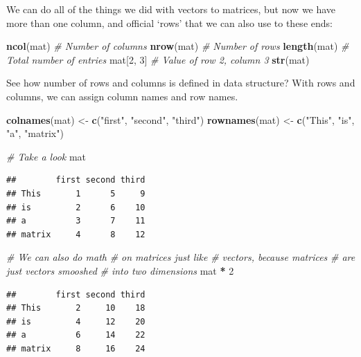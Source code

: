 \documentclass[
]{book}
\newenvironment{Shaded}{\begin{snugshade}}{\end{snugshade}}
\newcommand{\CommentTok}[1]{\textcolor[rgb]{0.56,0.35,0.01}{\textit{#1}}}
\newcommand{\DecValTok}[1]{\textcolor[rgb]{0.00,0.00,0.81}{#1}}
\newcommand{\KeywordTok}[1]{\textcolor[rgb]{0.13,0.29,0.53}{\textbf{#1}}}
\newcommand{\NormalTok}[1]{#1}
\newcommand{\OperatorTok}[1]{\textcolor[rgb]{0.81,0.36,0.00}{\textbf{#1}}}
\newcommand{\StringTok}[1]{\textcolor[rgb]{0.31,0.60,0.02}{#1}}
\begin{document}
We can do all of the things we did with vectors to matrices, but now we have more than one column, and official `rows' that we can also use to these ends:

\begin{Shaded}
\begin{Highlighting}[]
\KeywordTok{ncol}\NormalTok{(mat) }\CommentTok{# Number of columns}
\KeywordTok{nrow}\NormalTok{(mat) }\CommentTok{# Number of rows}
\KeywordTok{length}\NormalTok{(mat) }\CommentTok{# Total number of entries}
\NormalTok{mat[}\DecValTok{2}\NormalTok{, }\DecValTok{3}\NormalTok{] }\CommentTok{# Value of row 2, column 3}
\KeywordTok{str}\NormalTok{(mat)}
\end{Highlighting}
\end{Shaded}

See how number of rows and columns is defined in data structure? With rows and columns, we can assign column names and row names.

\begin{Shaded}
\begin{Highlighting}[]
\KeywordTok{colnames}\NormalTok{(mat) <-}\StringTok{ }\KeywordTok{c}\NormalTok{(}\StringTok{"first"}\NormalTok{, }\StringTok{"second"}\NormalTok{, }\StringTok{"third"}\NormalTok{)}
\KeywordTok{rownames}\NormalTok{(mat) <-}\StringTok{ }\KeywordTok{c}\NormalTok{(}\StringTok{"This"}\NormalTok{, }\StringTok{"is"}\NormalTok{, }\StringTok{"a"}\NormalTok{, }\StringTok{"matrix"}\NormalTok{)}

\CommentTok{# Take a look}
\NormalTok{mat}
\end{Highlighting}
\end{Shaded}

\begin{verbatim}
##        first second third
## This       1      5     9
## is         2      6    10
## a          3      7    11
## matrix     4      8    12
\end{verbatim}

\begin{Shaded}
\begin{Highlighting}[]
\CommentTok{# We can also do math}
\CommentTok{# on matrices just like}
\CommentTok{# vectors, because matrices}
\CommentTok{# are just vectors smooshed}
\CommentTok{# into two dimensions}
\NormalTok{mat }\OperatorTok{*}\StringTok{ }\DecValTok{2}
\end{Highlighting}
\end{Shaded}

\begin{verbatim}
##        first second third
## This       2     10    18
## is         4     12    20
## a          6     14    22
## matrix     8     16    24
\end{verbatim}
\end{document}
